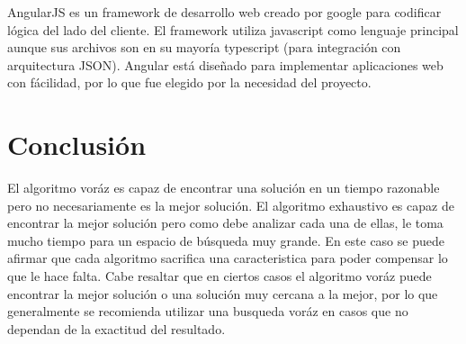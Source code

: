\documentclass[10pt]{report}
\begin{document}
AngularJS es un framework de desarrollo web creado por google para codificar lógica del lado del cliente. El framework utiliza javascript como lenguaje principal aunque sus archivos son en su mayoría typescript (para integración con arquitectura JSON). Angular está diseñado para implementar aplicaciones web con fácilidad, por lo que fue elegido por la necesidad del proyecto.

\section*{Conclusión}
El algoritmo voráz es capaz de encontrar una solución en un tiempo razonable pero no necesariamente es la mejor solución. El algoritmo exhaustivo es capaz de encontrar la mejor solución pero como debe analizar cada una de ellas, le toma mucho tiempo para un espacio de búsqueda muy grande. En este caso se puede afirmar que cada algoritmo sacrifica una caracteristica para poder compensar lo que le hace falta. Cabe resaltar que en ciertos casos el algoritmo voráz puede encontrar la mejor solución o una solución muy cercana a la mejor, por lo que generalmente se recomienda utilizar una busqueda voráz en casos que no dependan de la exactitud del resultado.  
\end{document}
